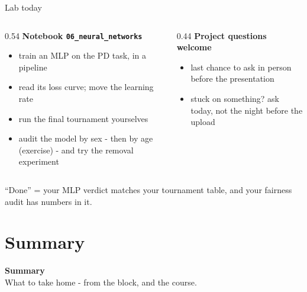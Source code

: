 \documentclass[10pt,aspectratio=169]{beamer}
\begin{document}
\begin{frame}{Lab today}
  \begin{columns}[T]
    \begin{column}{0.54\textwidth}
      \textbf{Notebook \texttt{06\_neural\_networks}}
      \begin{itemize}\small
        \item train an MLP on the PD task, in a pipeline
        \item read its loss curve; move the learning rate
        \item run the final tournament yourselves
        \item audit the model by sex - then by age (exercise) -
              and try the removal experiment
      \end{itemize}
    \end{column}
    \begin{column}{0.44\textwidth}
      \textbf{Project questions welcome}
      \begin{itemize}\small
        \item last chance to ask in person before the presentation
        \item stuck on something? ask \alert{today}, not the night
              before the upload
      \end{itemize}
    \end{column}
  \end{columns}
  \vspace{0.5em}
  \begin{center}\small
    ``Done'' = your MLP verdict matches your tournament table, and your
    fairness audit has numbers in it.
  \end{center}
\end{frame}

\section{Summary}

\begin{frame}[plain]
  \begin{center}
    \vspace{1.5cm}
    {\LARGE\textbf{Summary}}\\[0.6cm]
    {\normalsize What to take home - from the block, and the course.}
  \end{center}
\end{frame}
\end{document}
